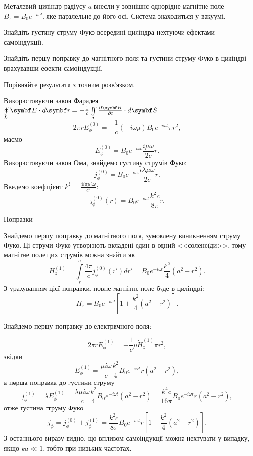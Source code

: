 \documentclass[]{ProblemBook}
\begin{document}
\begin{problem}
    Металевий циліндр радіусу $a$ внесли у зовнішнє однорідне магнітне поле  $B_z = B_0e^{-i\omega t}$, яке паралельне до його осі. Система знаходиться у вакуумі.
\begin{enumerate*}[label=\alph*)]
    \item Знайдіть густину струму Фуко всередині циліндра нехтуючи ефектами самоіндукції.
    \item Знайдіть першу поправку до магнітного поля та густини струму Фуко в циліндрі врахувавши ефекти самоіндукції.
\end{enumerate*}
 Порівняйте результати з точним розв'язком. 
\begin{solution}

\noindent\hrulefill

Використовуючи закон Фарадея $\oint\limits_L \Efield\cdot d\vect{r}  = - \frac1c \iint\limits_S \frac{\partial\Bfield}{\partial t}\cdot d\vect{S}$
\[
    2\pi r E_{\phi}^{(0)} = -\frac1{c} (-i\omega\mu)B_0e^{-i\omega t} \pi r^2,
\]
маємо
\[
    E_{\phi}^{(0)} =  B_0e^{-i\omega t} \frac{i\mu\omega}{2c}r.
\]
Використовуючи закон Ома, знайдемо густину струмів Фуко:
\[
    j_{\phi}^{(0)} = B_0e^{-i\omega t} \frac{i\lambda\mu \omega}{2c}r.
\]
Введемо коефіцієнт $k^2 = \frac{4i\pi\mu\lambda\omega}{c^2}$:
\[
    j_{\phi}^{(0)}(r) = B_0e^{-i\omega t} \frac{k^2c}{8\pi}r.
\]
\end{solution}

Поправки

\bigskip

Знайдемо першу поправку до магнітного поля, зумовлену виникненням струму Фуко. Ці струми Фуко утворюють вкладені один в одний <<соленоїди>>, тому магнітне поле цих струмів можна знайти як
\[
    H_z^{(1)} = \int\limits_r^{a} \frac{4\pi}{c} j_{\phi}^{(0)}(r')dr' = B_0e^{-i\omega t} \frac{k^2}{4}(a^2 - r^2). 
\]
З урахуванням цієї поправки, повне магнітне поле буде в циліндрі:
\[
    H_z =  B_0e^{-i\omega t}\left[ 1 + \frac{k^2}{4}(a^2 - r^2) \right]. 
\]

Знайдемо першу поправку до електричного поля:

\[
    2\pi r E_\phi^{(1)} = -\frac1c \mu \dot{H}_z^{(1)} \pi r^2, 
\]
звідки
\[
    E_\phi^{(1)} =  \frac{\mu i \omega}{c} \frac{k^2}{4}B_0e^{-i\omega t} r(a^2 - r^2),
\]
а перша поправка до густини струму
\[
    j_\phi^{(1)} = \lambda E_\phi^{(1)} = \frac{\lambda\mu i \omega}{c} \frac{k^2}{4}B_0e^{-i\omega t} (a^2 - r^2) = \frac{k^4c}{16\pi} B_0e^{-i\omega t} r(a^2 - r^2),
\]
отже густина струму Фуко 
\[
    j_{\phi} = j_\phi^{(0)} + j_\phi^{(1)} = \frac{k^2c}{8\pi}B_0e^{-i\omega t}r\left[ 1 + \frac{k^2}{4}\left( a^2 - r^2\right) \right]. 
\]
З останнього виразу видно, що впливом самоіндукції можна нехтувати у випадку, якщо $ka \ll 1$, тобто при низьких частотах.


\end{problem}
\end{document}
